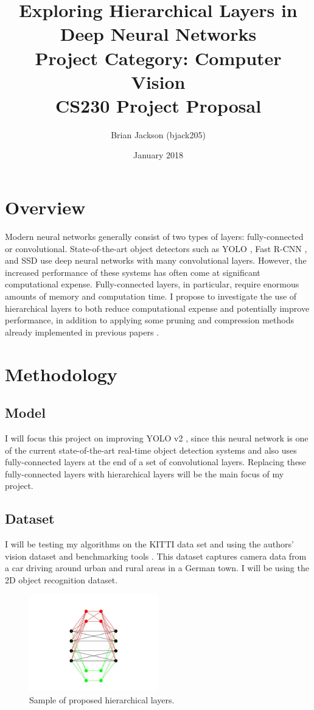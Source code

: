 \documentclass{article}
\title{Exploring Hierarchical Layers in Deep Neural Networks \\
	\large Project Category: Computer Vision \\ 
	CS230 Project Proposal\\
	}
\author{Brian Jackson (bjack205)}
\date{January 2018}
\begin{document}
	\maketitle
	
	\section{Overview}
	Modern neural networks generally consist of two types of layers: fully-connected or convolutional. State-of-the-art object detectors such as YOLO \cite{Redmon2015,Redmon2016}, Fast R-CNN \cite{Girshick2015}, and SSD \cite{Liu2016} use deep neural networks with many convolutional layers. However, the increased performance of these systems has often come at significant computational expense. Fully-connected layers, in particular, require enormous amounts of memory and computation time. I propose to investigate the use of hierarchical layers to both reduce computational expense and potentially improve performance, in addition to applying some pruning and compression methods already implemented in previous papers \cite{Novikov2015,V.Oseledets2011,Han2015}. 
	
	\section{Methodology}
	\subsection{Model}
	I will focus this project on improving YOLO v2 \cite{Redmon2016}, since this neural network is one of the current state-of-the-art real-time object detection systems and also uses fully-connected layers at the end of a set of convolutional layers. Replacing these fully-connected layers with hierarchical layers will be the main focus of my project.
	
	\subsection{Dataset}
	
	I will be testing my algorithms on the KITTI data set \cite{KITTIDataset} and using the authors' vision dataset and benchmarking tools \cite{KITTIVision}. This dataset captures camera data from a car driving around urban and rural areas in a German town. I will be using the 2D object recognition dataset.
	
	\begin{figure}
		\centering
		\includegraphics[width=0.5\textwidth]{HNN}
		\caption{Sample of proposed hierarchical layers.}
		\label{fig:hnn}
	\end{figure}
	
\end{document}
